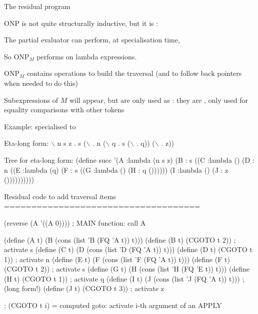 \documentclass[12pt,fleqn,landscape]{article}
\begin{document}
\begin{slide}{The  residual program\ \    }


ONP is not quite  structurally inductive, but  it is :
\vair

\hfill{}
\vair\vair


\bi
\item The partial evaluator can perform, at specialisation time, 

\hfill {}
\vair\vair

\item So ONP$_M$ performs  on  lambda expressions.
\vair\vair

\item ONP$_M$ contains  operations to build the traversal (and to follow back pointers when needed to do this)
\vair\vair

\item Subexpressions of $M$ will appear, but are only used as : they are , only used for equality comparisons with other tokens

\ei\end{slide}






\begin{slide}{Example:   specialised to 
} 

\bp
Eta-long form:  $\backslash$ n s z . s ($\backslash$ . n ($\backslash$ q . s ($\backslash$ . q)) ($\backslash$ . z))

Tree for eta-long form:
(define succ
'(A :lambda (n s z)
  (B : s
     ((C :lambda () (D : n ((E :lambda (q) (F : s ((G :lambda () (H : q ())))))
                            (I :lambda () (J : z ())))))))))
  
Residual code to add traversal items
====================================
  
(reverse (A '((A 0))))               ; MAIN function: call A

(define (A t) (B (cons (list 'B (FQ 'A t)) t)))
(define (B t) (CGOTO t 2))                     ; activate s
(define (C t) (D (cons (list 'D (FQ 'A t)) t)))
(define (D t) (CGOTO t 1))                     ; activate n
(define (E t) (F (cons (list 'F (FQ 'A t)) t)))
(define (F t) (CGOTO t 2))                     ; activate s
(define (G t) (H (cons (list 'H (FQ 'E t)) t)))
(define (H t) (CGOTO t 1))                     ; activate q
(define (I t) (J (cons (list 'J (FQ 'A t)) t)))   ;(long form!)
(define (J t) (CGOTO t 3))                     ; activate z

  ;   (CGOTO t i) = computed goto: activate i-th argument of an APPLY
  
\ep
\end{slide}
\end{document}
